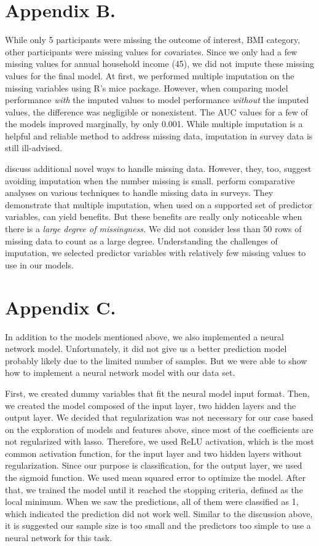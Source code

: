 \documentclass[twoside,11pt]{article}
\begin{document}
\section*{Appendix B.}\label{ab}
While only 5 participants were missing the outcome of interest, BMI category, other participants were missing values for covariates. Since we only had a few missing values for annual household income (45), we did not impute these missing values for the final model. At first, we performed multiple imputation on the missing variables using R's mice package. However, when comparing model performance {\em with} the imputed values to model performance {\em without} the imputed values, the difference was negligible or nonexistent. The AUC values for a few of the models improved marginally, by only 0.001. While multiple imputation is a helpful and reliable method to address missing data, imputation in survey data is still ill-advised.

\cite{wl:19} discuss additional novel ways to handle missing data. However, they, too, suggest avoiding imputation when the number missing is small. \cite{curley:19} perform comparative analyses on various techniques to handle missing data in surveys. They demonstrate that multiple imputation, when used on a supported set of predictor variables, can yield benefits. But these benefits are really only noticeable when there is a {\em large degree of missingness.} We did not consider less than 50 rows of missing data to count as a large degree. Understanding the challenges of imputation, we selected predictor variables with relatively few missing values to use in our models.

\section*{Appendix C.}\label{ac}
In addition to the models mentioned above, we also implemented a neural network model. Unfortunately, it did not give us a better prediction model probably likely due to the limited number of samples. But we were able to show how to implement a neural network model with our data set.

First, we created dummy variables that fit the neural model input format. Then, we created the model composed of the input layer, two hidden layers and the output layer. We decided that regularization was not necessary for our case based on the exploration of models and features above, since most of the coefficients are not regularized with lasso. Therefore, we used ReLU activation, which is the most common activation function, for the input layer and two hidden layers without regularization. Since our purpose is classification, for the output layer, we used the sigmoid function. We used mean squared error to optimize the model. After that, we trained the model until it reached the stopping criteria, defined as the local minimum. When we saw the predictions, all of them were classified as 1, which indicated the prediction did not work well. Similar to the  discussion above, it is suggested our sample size is too small and the predictors too simple to use a neural network for this task.
\end{document}
